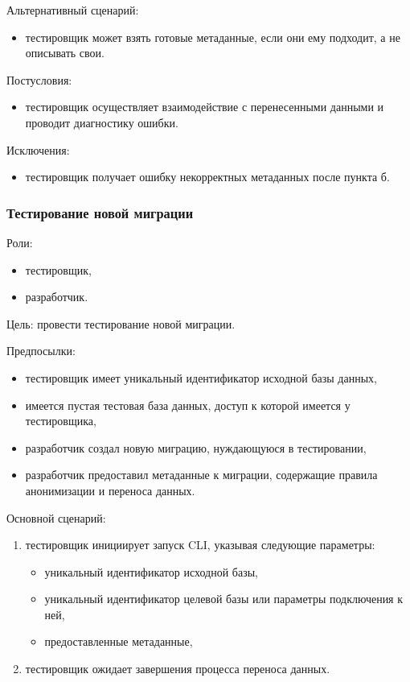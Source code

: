 Альтернативный сценарий:

\begin{itemize}
    \item тестировщик может взять готовые метаданные, если они ему подходит, а не описывать свои.
\end{itemize}

Постусловия:

\begin{itemize}
    \item тестировщик осуществляет взаимодействие с перенесенными данными и проводит диагностику ошибки.
\end{itemize}

Исключения:

\begin{itemize}
    \item тестировщик получает ошибку некорректных метаданных после пункта б.
\end{itemize}


\subsubsection{Тестирование новой миграции}

Роли:

\begin{itemize}
    \item тестировщик,
    \item разработчик.
\end{itemize}

Цель: провести тестирование новой миграции.

Предпосылки:

\begin{itemize}
    \item тестировщик имеет уникальный идентификатор исходной базы данных,
    \item имеется пустая тестовая база данных, доступ к которой имеется у тестировщика,
    \item разработчик создал новую миграцию, нуждающуюся в тестировании,
    \item разработчик предоставил метаданные к миграции, содержащие правила анонимизации и переноса данных.
\end{itemize}

Основной сценарий:

\begin{enumerate}
    \item тестировщик инициирует запуск CLI, указывая следующие параметры:
    \begin{itemize}
        \item уникальный идентификатор исходной базы,
        \item уникальный идентификатор целевой базы или параметры подключения к ней,
        \item предоставленные метаданные,
    \end{itemize}
    \item тестировщик ожидает завершения процесса переноса данных.
\end{enumerate}

